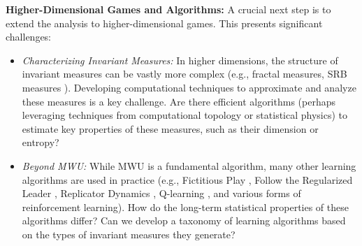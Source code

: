 \documentclass[format=acmsmall, authorversion, screen=true]{acmart}
\begin{document}

    \textbf{Higher-Dimensional Games and Algorithms:}  A crucial next step is to extend the analysis to higher-dimensional games.  This presents significant challenges:
 \begin{itemize}
        \item
        \textit{Characterizing Invariant Measures:}  In higher dimensions, the structure of invariant measures can be vastly more complex (e.g., fractal measures, SRB measures \cite{young2002srb}).  Developing computational techniques to approximate and analyze these measures is a key challenge. Are there efficient algorithms (perhaps leveraging techniques from computational topology \cite{edelsbrunner2010computational} or statistical physics) to estimate key properties of these measures, such as their dimension or entropy?
        \item \textit{Beyond MWU:} While MWU is a fundamental algorithm, many other learning algorithms are used in practice (e.g., Fictitious Play \cite{brown1951iterative}, Follow the Regularized Leader \cite{shalev2012online}, Replicator Dynamics \cite{taylor1978evolutionary}, Q-learning \cite{watkins1992q}, and various forms of reinforcement learning).  How do the long-term statistical properties of these algorithms differ?  Can we develop a taxonomy of learning algorithms based on the types of invariant measures they generate?
    \end{itemize}
\end{document}
